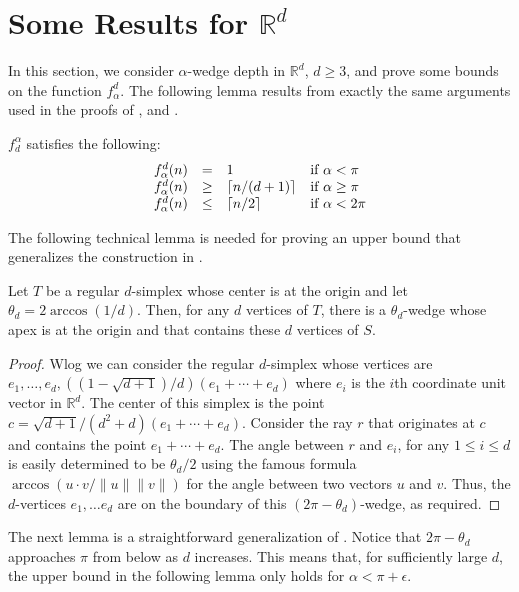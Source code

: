 \documentclass[lotsofwhite]{patmorin}
\newcommand{\blah}[1]{2\arccos(1/#1)}
\begin{document}
\section{Some Results for $\mathbb{R}^d$}

In this section, we consider $\alpha$-wedge depth in $\mathbb{R}^d$,
$d\ge 3$, and prove  some bounds on the function $f^d_\alpha$.  The
following lemma results from exactly the same arguments used in the
proofs of ,  and .

\begin{lem}
$f^\alpha_d$ satisfies the following:
\[\begin{array}{lcll}
  f^d_\alpha(n) & = & 1 & \mbox{if $\alpha < \pi$} \\
  f^d_\alpha(n) & \ge & \left\lceil n/(d+1) \right\rceil & \mbox{if $\alpha \ge \pi$} \\
  f^d_\alpha(n) & \le & \left\lceil n/2 \right\rceil & \mbox{if $\alpha < 2\pi$} \\
\end{array}\]
\end{lem}

The following technical lemma is needed for proving an upper bound
that generalizes the construction in .

\begin{lem}
Let $T$ be a regular $d$-simplex whose center is at the origin and let
$\theta_d=\blah{d}$.  Then, for any $d$ vertices of $T$, there is a
$\theta_d$-wedge whose apex is at the origin and that contains these
$d$ vertices of $S$.
\end{lem}

\begin{proof} 
Wlog we can consider the regular $d$-simplex whose vertices are
$e_1,\ldots,e_d, ((1-\sqrt{d+1})/d)(e_1+\cdots+e_d)$ where $e_i$ is the
$i$th coordinate unit vector in $\mathbb{R}^d$.  The center of this
simplex is the point $c=\sqrt{d+1}/(d^2+d)(e_1+\cdots+ e_d)$.
Consider the ray $r$ that originates at $c$ and
contains the point $e_1+\cdots+e_d$.  The angle between $r$ and
$e_i$, for any $1\le i\le d$ is easily determined to be
$\theta_d/2$ using the famous formula $\arccos (u\cdot
v/\|u\|\|v\|)$ for the angle between two vectors $u$ and $v$.   Thus,
the $d$-vertices $e_1,\ldots e_d$ are on the boundary of this
$(2\pi-\theta_d)$-wedge, as required.  
\end{proof}

The next lemma is a straightforward generalization of .
Notice that $2\pi-\theta_d$ approaches $\pi$ from below as $d$ increases.
This means that, for sufficiently large $d$, the upper bound in the
following lemma only holds for $\alpha < \pi+\epsilon$.
\end{document}
